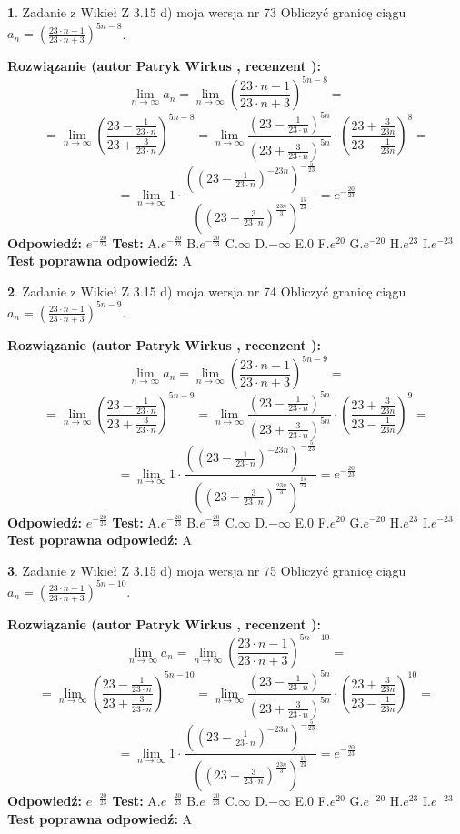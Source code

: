 \documentclass[12pt, a4paper]{article}
\theoremstyle{definition} %
\newtheorem{zad}{}
\newcommand{\zadStart}[1]{\begin{zad}#1\newline}
\newcommand{\zadStop}{\end{zad}}
\newcommand{\rozwStart}[2]{\noindent \textbf{Rozwiązanie (autor #1 , recenzent #2): }\newline}
\newcommand{\rozwStop}{\newline}
\newcommand{\odpStart}{\noindent \textbf{Odpowiedź:}\newline}
\newcommand{\odpStop}{\newline}
\newcommand{\testStart}{\noindent \textbf{Test:}\newline}
\newcommand{\testStop}{\newline}
\newcommand{\kluczStart}{\noindent \textbf{Test poprawna odpowiedź:}\newline}
\newcommand{\kluczStop}{\newline}
\begin{document}
\zadStart{Zadanie z Wikieł Z 3.15 d) moja wersja nr 73}
Obliczyć granicę ciągu $a_{n}=(\frac{23\cdot n - 1}{23 \cdot n + 3})^{5n-8}$.
\zadStop
\rozwStart{Patryk Wirkus}{}
$$\lim\limits_{n\to\infty} a_{n} = \lim\limits_{n\to\infty}(\frac{23\cdot n - 1}{23 \cdot n + 3})^{5n-8}=$$
$$=\lim\limits_{n\to\infty}(\frac{23 - \frac{1}{23\cdot n}}{23 + \frac{3}{23 \cdot n}})^{5n-8}=\lim\limits_{n\to\infty}\frac{(23 - \frac{1}{23\cdot n})^{5n}}{(23 + \frac{3}{23\cdot n})^{5n}} \cdot (\frac{23+\frac{3}{23n}}{23-\frac{1}{23n}})^{8}=$$
$$=\lim\limits_{n\to\infty} 1 \cdot \frac{((23-\frac{1}{23 \cdot n})^{-23n})^{-\frac{5}{23}}}{((23+\frac{3}{23 \cdot n})^{\frac{23n}{3}})^{\frac{15}{23}}} =e^{-\frac{20}{23}}$$
\rozwStop
\odpStart
$e^{-\frac{20}{23}}$
\odpStop
\testStart
A.$ e^{-\frac{20}{23}}$
B.$ e^{-\frac{20}{23}}$
C.$\infty$
D.$-\infty$
E.$0$
F.$e^{20}$
G.$e^{-20}$
H.$e^{23}$
I.$e^{-23}$
\testStop
\kluczStart
A
\kluczStop



\zadStart{Zadanie z Wikieł Z 3.15 d) moja wersja nr 74}
Obliczyć granicę ciągu $a_{n}=(\frac{23\cdot n - 1}{23 \cdot n + 3})^{5n-9}$.
\zadStop
\rozwStart{Patryk Wirkus}{}
$$\lim\limits_{n\to\infty} a_{n} = \lim\limits_{n\to\infty}(\frac{23\cdot n - 1}{23 \cdot n + 3})^{5n-9}=$$
$$=\lim\limits_{n\to\infty}(\frac{23 - \frac{1}{23\cdot n}}{23 + \frac{3}{23 \cdot n}})^{5n-9}=\lim\limits_{n\to\infty}\frac{(23 - \frac{1}{23\cdot n})^{5n}}{(23 + \frac{3}{23\cdot n})^{5n}} \cdot (\frac{23+\frac{3}{23n}}{23-\frac{1}{23n}})^{9}=$$
$$=\lim\limits_{n\to\infty} 1 \cdot \frac{((23-\frac{1}{23 \cdot n})^{-23n})^{-\frac{5}{23}}}{((23+\frac{3}{23 \cdot n})^{\frac{23n}{3}})^{\frac{15}{23}}} =e^{-\frac{20}{23}}$$
\rozwStop
\odpStart
$e^{-\frac{20}{23}}$
\odpStop
\testStart
A.$ e^{-\frac{20}{23}}$
B.$ e^{-\frac{20}{23}}$
C.$\infty$
D.$-\infty$
E.$0$
F.$e^{20}$
G.$e^{-20}$
H.$e^{23}$
I.$e^{-23}$
\testStop
\kluczStart
A
\kluczStop



\zadStart{Zadanie z Wikieł Z 3.15 d) moja wersja nr 75}
Obliczyć granicę ciągu $a_{n}=(\frac{23\cdot n - 1}{23 \cdot n + 3})^{5n-10}$.
\zadStop
\rozwStart{Patryk Wirkus}{}
$$\lim\limits_{n\to\infty} a_{n} = \lim\limits_{n\to\infty}(\frac{23\cdot n - 1}{23 \cdot n + 3})^{5n-10}=$$
$$=\lim\limits_{n\to\infty}(\frac{23 - \frac{1}{23\cdot n}}{23 + \frac{3}{23 \cdot n}})^{5n-10}=\lim\limits_{n\to\infty}\frac{(23 - \frac{1}{23\cdot n})^{5n}}{(23 + \frac{3}{23\cdot n})^{5n}} \cdot (\frac{23+\frac{3}{23n}}{23-\frac{1}{23n}})^{10}=$$
$$=\lim\limits_{n\to\infty} 1 \cdot \frac{((23-\frac{1}{23 \cdot n})^{-23n})^{-\frac{5}{23}}}{((23+\frac{3}{23 \cdot n})^{\frac{23n}{3}})^{\frac{15}{23}}} =e^{-\frac{20}{23}}$$
\rozwStop
\odpStart
$e^{-\frac{20}{23}}$
\odpStop
\testStart
A.$ e^{-\frac{20}{23}}$
B.$ e^{-\frac{20}{23}}$
C.$\infty$
D.$-\infty$
E.$0$
F.$e^{20}$
G.$e^{-20}$
H.$e^{23}$
I.$e^{-23}$
\testStop
\kluczStart
A
\kluczStop
\end{document}
